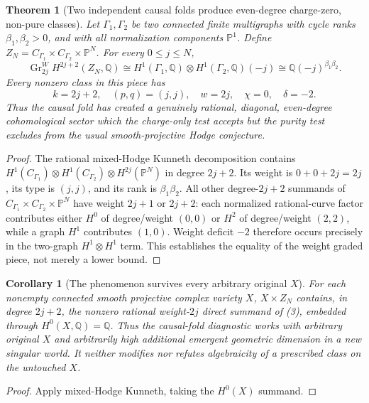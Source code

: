 \documentclass[11pt]{article}
\newtheorem{theorem}{Theorem}
\newtheorem{corollary}{Corollary}
\begin{document}
\begin{theorem}[Two independent causal folds produce even-degree
charge-zero, non-pure classes]
Let $\Gamma_1,\Gamma_2$ be two connected finite multigraphs with
cycle ranks $\beta_1,\beta_2>0$, and with all normalization components
$\mathbb P^1$. Define
$Z_N=C_{\Gamma_1}\times C_{\Gamma_2}\times\mathbb P^N$.
For every $0\leq j\leq N$,
\[
\boxed{\quad
\operatorname{Gr}^{W}_{2j} H^{2j+2}(Z_N,\mathbb Q)
\cong
 H^1(\Gamma_1,\mathbb Q)\otimes
 H^1(\Gamma_2,\mathbb Q)(-j)
\cong\mathbb Q(-j)^{\beta_1\beta_2}.
\quad}\tag{3}
\]
Every nonzero class in this piece has
\[
    k=2j+2,\quad (p,q)=(j,j),\quad
    w=2j,\quad\chi=0,\quad\delta=-2.
\]
Thus the causal fold has created a genuinely rational, diagonal,
even-degree cohomological sector which the \emph{charge-only}
test accepts but the purity test excludes from the usual
smooth-projective Hodge conjecture.
\end{theorem}
\begin{proof}
The rational mixed-Hodge Kunneth decomposition contains
$H^1(C_{\Gamma_1})\otimes H^1(C_{\Gamma_2})
\otimes H^{2j}(\mathbb P^N)$ in degree $2j+2$.
Its weight is $0+0+2j=2j$, its type is $(j,j)$, and its rank is
$\beta_1\beta_2$. All other degree-$2j+2$ summands of
$C_{\Gamma_1}\times C_{\Gamma_2}\times\mathbb P^N$
have weight $2j+1$ or $2j+2$: each normalized rational-curve
factor contributes either $H^0$ of degree/weight $(0,0)$ or
$H^2$ of degree/weight $(2,2)$, while a graph $H^1$ contributes
$(1,0)$. Weight deficit $-2$ therefore occurs precisely in the
two-graph $H^1\otimes H^1$ term. This establishes the equality
of the weight graded piece, not merely a lower bound.
\end{proof}

\begin{corollary}[The phenomenon survives every arbitrary original $X$]
For each nonempty connected smooth projective complex variety $X$,
$X\times Z_N$ contains, in degree $2j+2$, the nonzero rational
weight-$2j$ direct summand of (3), embedded through
$H^0(X,\mathbb Q)=\mathbb Q$. Thus the causal-fold diagnostic works
with arbitrary original $X$ and arbitrarily high additional emergent
geometric dimension \emph{in a new singular world}. It neither
modifies nor refutes algebraicity of a prescribed class on the
untouched $X$.
\end{corollary}
\begin{proof}
Apply mixed-Hodge Kunneth, taking the $H^0(X)$ summand.
\end{proof}
\end{document}
